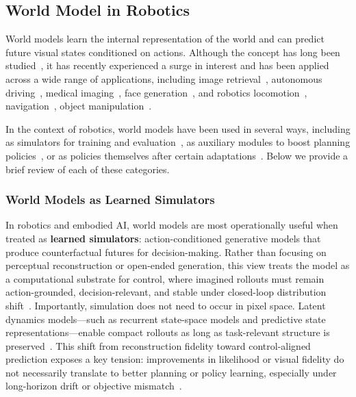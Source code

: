 \documentclass{article}
\begin{document}
\subsection{World Model in Robotics}
World models learn the internal representation of the world and can predict future visual states conditioned on actions. Although the concept has long been studied~\citep{craik1967nature,sandage1988observational,ha2018world}, it has recently experienced a surge in interest and has been applied across a wide range of applications, including image retrieval~\citep{Yuanmin_2025_CVPR}, autonomous driving~\citep{Hassan_2025_CVPR,Zhao_2025_CVPR}, medical imaging~\citep{Yue_2025_CVPR,yang2025medical}, face generation~\citep{zheng2025learning}, and robotics locomotion~\citep{hao2025neural,wang2025disentangled}, navigation~\citep{bar2025navigation,yao2025navmorph}, object manipulation~\citep{zhen2025learning}.

In the context of robotics, world models have been used in several ways, including as simulators for training and evaluation~\citep{shang2025roboscape}, as auxiliary modules to boost planning policies~\citep{yin2025womap}, or as policies themselves after certain adaptations~\citep{goswami2025osvi}. Below we provide a brief review of each of these categories. 

\subsubsection{World Models as Learned Simulators}

In robotics and embodied AI, world models are most operationally useful when treated as \textbf{learned simulators}: action-conditioned generative models that produce counterfactual futures for decision-making. Rather than focusing on perceptual reconstruction or open-ended generation, this view treats the model as a computational substrate for control, where imagined rollouts must remain action-grounded, decision-relevant, and stable under closed-loop distribution shift~\citep{ha2018world,hafner2019_planet,hafner2020_dreamer}. Importantly, simulation does not need to occur in pixel space. Latent dynamics models—such as recurrent state-space models and predictive state representations—enable compact rollouts as long as task-relevant structure is preserved~\citep{littman2001_psr}. This shift from reconstruction fidelity toward control-aligned prediction exposes a key tension: improvements in likelihood or visual fidelity do not necessarily translate to better planning or policy learning, especially under long-horizon drift or objective mismatch~\citep{lambert2020_objective_mismatch,soh2026_action_hallucination}.
\end{document}
